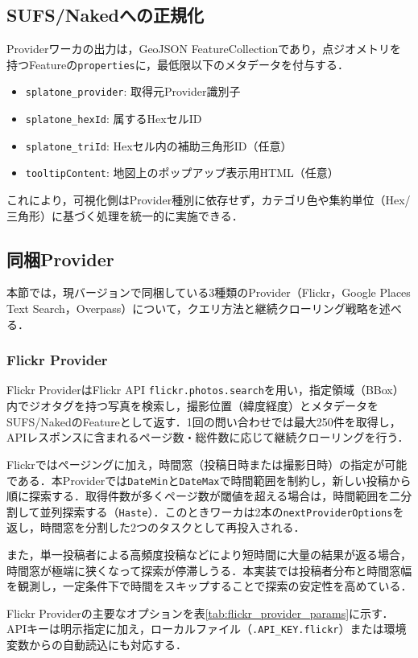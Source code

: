 \documentclass[11pt,a4paper]{jlreq}
\begin{document}
\subsection{SUFS/Nakedへの正規化}
Providerワーカの出力は，GeoJSON FeatureCollectionであり，点ジオメトリを持つFeatureの\texttt{properties}に，最低限以下のメタデータを付与する．
\begin{itemize}
  \item \texttt{splatone\_provider}: 取得元Provider識別子
  \item \texttt{splatone\_hexId}: 属するHexセルID
  \item \texttt{splatone\_triId}: Hexセル内の補助三角形ID（任意）
  \item \texttt{tooltipContent}: 地図上のポップアップ表示用HTML（任意）
\end{itemize}
これにより，可視化側はProvider種別に依存せず，カテゴリ色や集約単位（Hex/三角形）に基づく処理を統一的に実施できる．

\subsection{同梱Provider}
本節では，現バージョンで同梱している3種類のProvider（Flickr，Google Places Text Search，Overpass）について，クエリ方法と継続クローリング戦略を述べる．

\subsubsection{Flickr Provider}
Flickr ProviderはFlickr API \texttt{flickr.photos.search}を用い，指定領域（BBox）内でジオタグを持つ写真を検索し，撮影位置（緯度経度）とメタデータをSUFS/NakedのFeatureとして返す．1回の問い合わせでは最大250件を取得し，APIレスポンスに含まれるページ数・総件数に応じて継続クローリングを行う．

Flickrではページングに加え，時間窓（投稿日時または撮影日時）の指定が可能である．本Providerでは\texttt{DateMin}と\texttt{DateMax}で時間範囲を制約し，新しい投稿から順に探索する．取得件数が多くページ数が閾値を超える場合は，時間範囲を二分割して並列探索する（\texttt{Haste}）．このときワーカは2本の\texttt{nextProviderOptions}を返し，時間窓を分割した2つのタスクとして再投入される．

また，単一投稿者による高頻度投稿などにより短時間に大量の結果が返る場合，時間窓が極端に狭くなって探索が停滞しうる．本実装では投稿者分布と時間窓幅を観測し，一定条件下で時間をスキップすることで探索の安定性を高めている．

Flickr Providerの主要なオプションを表\ref{tab:flickr_provider_params}に示す．APIキーは明示指定に加え，ローカルファイル（\texttt{.API\_KEY.flickr}）または環境変数からの自動読込にも対応する．
\end{document}
